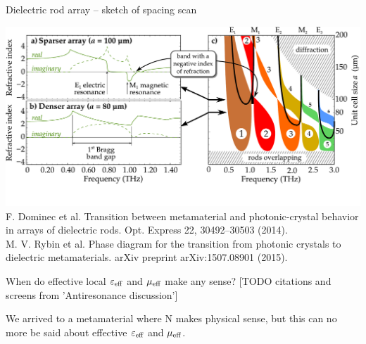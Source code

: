 \documentclass[t]{beamer} \usepackage[english]{babel} \usepackage[utf8]{inputenc} \usetheme{Frankfurt} %
\begin{document}
\begin{frame}{Dielectric rod array -- sketch of spacing scan}	%

\hfill
\includegraphics[width=\textwidth]{../img/ERods_forSeefeld_sparserN_denserN_DrawnBands.pdf}
\hfill
\footnotesize{F. Dominec et al. Transition between metamaterial and photonic-crystal behavior in arrays of dielectric rods. Opt. Express 22, 30492--30503 (2014).\\
M. V. Rybin et al. Phase diagram for the transition from photonic crystals to dielectric metamaterials. arXiv preprint arXiv:1507.08901 (2015).}
\end{frame} 		%

\begin{frame}{When do effective local $\varepsilon_{\text{eff} }$ and $\mu_{\text{eff} }$ make any sense?}	%
 [TODO citations and screens from 'Antiresonance discussion']

We arrived to a metamaterial where N makes physical sense, but this can no more be said about effective $\varepsilon_{\text{eff} }$ and $\mu_{\text{eff} }$.
\end{frame} 		%
\end{document}
